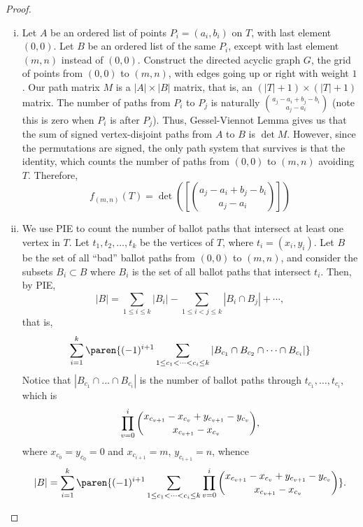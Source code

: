 \documentclass[letterpaper]{article}
\begin{document}
\begin{proof}
\begin{enumerate}[(i)]
    \item Let $A$ be an ordered list of points $P_i=(a_i,b_i)$ on $T$, with last element $(0,0)$. Let $B$ be an ordered list of the same $P_i$, except with last element $(m,n)$ instead of $(0,0)$. Construct the directed acyclic graph $G$, the grid of points from $(0,0)$ to $(m,n)$, with edges going up or right with weight $1$. Our path matrix $M$ is a $|A|\times |B|$ matrix, that is, an $(|T|+1)\times (|T|+1)$ matrix. The number of paths from $P_i$ to $P_j$ is naturally $\binom{a_j-a_i+b_j-b_i}{a_j-a_i}$ (note this is zero when $P_i$ is after $P_j$). Thus, Gessel-Viennot Lemma gives us that the sum of signed vertex-disjoint paths from $A$ to $B$ is $\det M$. However, since the permutations are signed, the only path system that survives is that the identity, which counts the number of paths from $(0,0)$ to $(m,n)$ avoiding $T$. Therefore, \[f_{(m,n)}(T)=\det(\left[\binom{a_j-a_i+b_j-b_i}{a_j-a_i}\right])\]
    \item We use PIE to count the number of ballot paths that intersect at least one vertex in $T$. Let $t_1,t_2,\dots,t_k$ be the vertices of $T$, where $t_i=(x_i,y_i)$. Let $B$ be the set of all ``bad'' ballot paths from $(0,0)$ to $(m,n)$, and consider the subsets $B_i\subset B$ where $B_i$ is the set of all ballot paths that intersect $t_i$. Then, by PIE, \[|B|=\sum_{1\leq i\leq k}|B_i|-\sum_{1\leq i<j\leq k}|B_i\cap B_j|+\cdots,\] that is, \[\sum_{i=1}^k\paren{(-1)^{i+1}\sum_{1\leq c_1<\cdots<c_i\leq k}|B_{c_1}\cap B_{c_2}\cap\cdots\cap B_{c_i}|}\]
    Notice that $|B_{c_1}\cap \dots \cap B_{c_i}|$ is the number of ballot paths through $t_{c_1},\dots,t_{c_i}$, which is \[\prod_{v=0}^i\dbinom{x_{c_{v+1}}-x_{c_v}+y_{c_{v+1}}-y_{c_v}}{x_{c_{v+1}}-x_{c_v}},\] where $x_{c_0}=y_{c_0}=0$ and $x_{c_{i+1}}=m$, $y_{c_{i+1}}=n$, whence 
    \[|B|=\sum_{i=1}^k\paren{(-1)^{i+1}\sum_{1\leq c_1<\cdots<c_i\leq k}\prod_{v=0}^i\dbinom{x_{c_{v+1}}-x_{c_v}+y_{c_{v+1}}-y_{c_v}}{x_{c_{v+1}}-x_{c_v}}}.\]
    \end{enumerate}
\end{proof}
\end{document}
